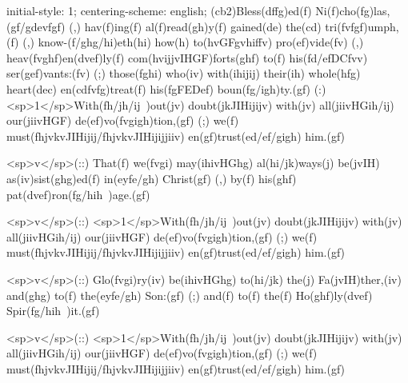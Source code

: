 initial-style: 1;
centering-scheme: english;
(cb2)Bless(dffg)ed(f) Ni(f)cho(fg)las,(gf/gdevfgf) (,) hav(f)ing(f) al(f)read(gh)y(f) gained(de) the(cd) tri(fvfgf)umph,(f) (,) know-(f/ghg/hi)eth(hi) how(h) to(hvGFgvhiffv) pro(ef)vide(fv) (,) heav(fvghf)en(dvef)ly(f) com(hvijjvIHGF)forts(ghf) to(f) his(fd/efDCfvv) ser(gef)vants:(fv) (;) those(fghi) who(iv) with(ihijij) their(ih) whole(hfg) heart(dec) en(cdfvfg)treat(f) his(fgFEDef) boun(fg/igh)ty.(gf) (:) <sp>1</sp>With(fh/jh/ij~)out(jv) doubt(jkJIHijijv) with(jv) all(jiivHGih/ij) our(jiivHGF) de(ef)vo(fvgigh)tion,(gf) (;) we(f) must(fhjvkvJIHijij/fhjvkvJIHijijjiiv) en(gf)trust(ed/ef/gigh) him.(gf)

<sp>v</sp>(::) That(f) we(fvgi) may(ihivHGhg) al(hi/jk)ways(j) be(jvIH) as(iv)sist(ghg)ed(f) in(eyfe/gh) Christ(gf) (,) by(f) his(ghf) pat(dvef)ron(fg/hih~)age.(gf)

<sp>v</sp>(::) <sp>1</sp>With(fh/jh/ij~)out(jv) doubt(jkJIHijijv) with(jv) all(jiivHGih/ij) our(jiivHGF) de(ef)vo(fvgigh)tion,(gf) (;) we(f) must(fhjvkvJIHijij/fhjvkvJIHijijjiiv) en(gf)trust(ed/ef/gigh) him.(gf)

<sp>v</sp>(::) Glo(fvgi)ry(iv) be(ihivHGhg) to(hi/jk) the(j) Fa(jvIH)ther,(iv) and(ghg) to(f) the(eyfe/gh) Son:(gf) (;) and(f) to(f) the(f) Ho(ghf)ly(dvef) Spir(fg/hih~)it.(gf)

<sp>v</sp>(::) <sp>1</sp>With(fh/jh/ij~)out(jv) doubt(jkJIHijijv) with(jv) all(jiivHGih/ij) our(jiivHGF) de(ef)vo(fvgigh)tion,(gf) (;) we(f) must(fhjvkvJIHijij/fhjvkvJIHijijjiiv) en(gf)trust(ed/ef/gigh) him.(gf)
